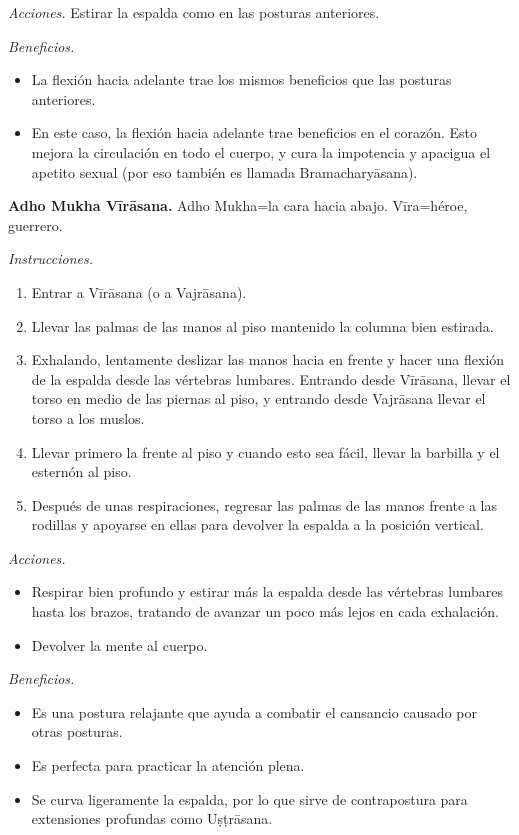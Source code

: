 \emph{Acciones.} Estirar la espalda como en
las posturas anteriores.

\emph{Beneficios.}
\begin{itemize}
\item La flexión hacia adelante trae los
mismos beneficios que las posturas
anteriores.
\item En este caso, la flexión hacia adelante
trae beneficios en el corazón. Esto mejora la
circulación en todo el cuerpo, y cura la
impotencia y apacigua el apetito sexual (por
eso también es llamada Bramacharyāsana).
\end{itemize}

\medskip\noindent\textbf{Adho Mukha
Vīrāsana.}
Adho Mukha=la cara hacia abajo. Vīra=héroe,
guerrero.

\emph{Instrucciones.}
\begin{enumerate}
\item Entrar a Vīrāsana (o a Vajrāsana).
\item Llevar las palmas de las manos al piso
mantenido la columna bien estirada.
\item Exhalando, lentamente deslizar las
manos hacia en frente y hacer una flexión de
la espalda desde las vértebras lumbares.
Entrando desde Vīrāsana, llevar el torso en
medio de las piernas al piso, y entrando
desde Vajrāsana llevar el torso a los muslos.
\item Llevar primero la frente al piso y
cuando esto sea fácil, llevar la barbilla y
el esternón al piso.
\item Después de unas respiraciones, regresar
las palmas de las manos frente a las rodillas
y apoyarse en ellas para devolver la espalda
a la posición vertical.
\end{enumerate}

\emph{Acciones.}
\begin{itemize}
\item Respirar bien profundo y estirar más la
espalda desde las vértebras lumbares hasta
los brazos, tratando de avanzar un poco más
lejos en cada exhalación.
\item Devolver la mente al cuerpo.
\end{itemize}

\emph{Beneficios.}
\begin{itemize}
\item Es una postura relajante que ayuda a
combatir el cansancio causado por otras
posturas.
\item Es perfecta para practicar la atención
plena.
\item Se curva ligeramente la espalda, por lo
que sirve de contrapostura para extensiones
profundas como Uṣṭrāsana.
\end{itemize}

